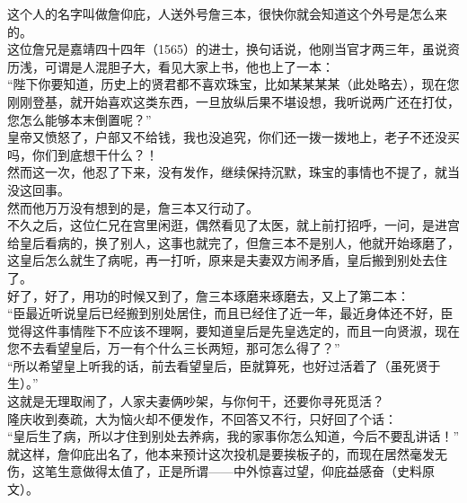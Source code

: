 \begin{multicols}{\theparacolNo}
这个人的名字叫做詹仰庇，人送外号詹三本，很快你就会知道这个外号是怎么来的。\\

这位詹兄是嘉靖四十四年（1565）的进士，换句话说，他刚当官才两三年，虽说资历浅，可谓是人混胆子大，看见大家上书，他也上了一本：\\

“陛下你要知道，历史上的贤君都不喜欢珠宝，比如某某某某（此处略去），现在您刚刚登基，就开始喜欢这类东西，一旦放纵后果不堪设想，我听说两广还在打仗，您怎么能够本末倒置呢？”\\

皇帝又愤怒了，户部又不给钱，我也没追究，你们还一拨一拨地上，老子不还没买吗，你们到底想干什么？！\\

然而这一次，他忍了下来，没有发作，继续保持沉默，珠宝的事情也不提了，就当没这回事。\\

然而他万万没有想到的是，詹三本又行动了。\\

不久之后，这位仁兄在宫里闲逛，偶然看见了太医，就上前打招呼，一问，是进宫给皇后看病的，换了别人，这事也就完了，但詹三本不是别人，他就开始琢磨了，这皇后怎么就生了病呢，再一打听，原来是夫妻双方闹矛盾，皇后搬到别处去住了。\\

好了，好了，用功的时候又到了，詹三本琢磨来琢磨去，又上了第二本：\\

“臣最近听说皇后已经搬到别处居住，而且已经住了近一年，最近身体还不好，臣觉得这件事情陛下不应该不理啊，要知道皇后是先皇选定的，而且一向贤淑，现在您不去看望皇后，万一有个什么三长两短，那可怎么得了？”\\

“所以希望皇上听我的话，前去看望皇后，臣就算死，也好过活着了（虽死贤于生）。”\\

这就是无理取闹了，人家夫妻俩吵架，与你何干，还要你寻死觅活？\\

隆庆收到奏疏，大为恼火却不便发作，不回答又不行，只好回了个话：\\

“皇后生了病，所以才住到别处去养病，我的家事你怎么知道，今后不要乱讲话！”\\

就这样，詹仰庇出名了，他本来预计这次投机是要挨板子的，而现在居然毫发无伤，这笔生意做得太值了，正是所谓——中外惊喜过望，仰庇益感奋（史料原文）。\\


\end{multicols}
